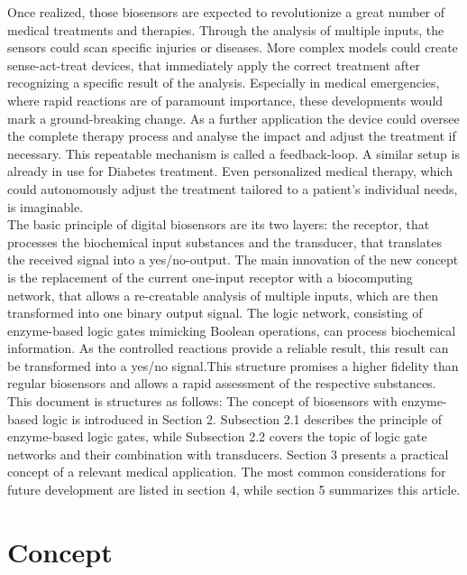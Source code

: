 \documentclass[runningheads]{llncs}
\begin{document}
	Once realized, those biosensors are expected to revolutionize a great number of medical treatments and therapies. Through the analysis of multiple inputs, the sensors could scan specific injuries or diseases. More complex models could create sense-act-treat devices, that immediately apply the correct treatment after recognizing a specific result of the analysis. Especially in medical emergencies, where rapid reactions are of paramount importance, these developments would mark a ground-breaking change. As a further application the device could oversee the complete therapy process and analyse the impact and adjust the treatment if necessary. This repeatable mechanism is called a feedback-loop. A similar setup is already in use for Diabetes treatment. Even personalized medical therapy, which could autonomously adjust the treatment tailored to a patient’s individual needs, is imaginable. \cite{original}\\
	
	The basic principle of digital biosensors are its two layers: the receptor, that processes the biochemical input substances and the transducer, that translates the received signal into a yes/no-output. The main innovation of the new concept is the replacement of the current one-input receptor with a biocomputing network, that allows a re-creatable analysis of multiple inputs, which are then transformed into one binary output signal. The logic network, consisting of enzyme-based logic gates mimicking Boolean operations, can process biochemical information. As the controlled reactions provide a reliable result, this result can be transformed into a yes/no signal.This structure promises a higher fidelity than regular biosensors and allows a rapid assessment of the respective substances.\cite{state of the art}\\ 
	
	This document is structures as follows: The concept of biosensors with enzyme-based logic is introduced in Section 2. Subsection 2.1 describes the principle of enzyme-based logic gates, while Subsection 2.2 covers the topic of logic gate networks and their combination with transducers. Section 3 presents a practical concept of a relevant medical application. The most common considerations for future development are listed in section 4, while section 5 summarizes this article.
	
	
	
	
	
\section{Concept}
\end{document}
